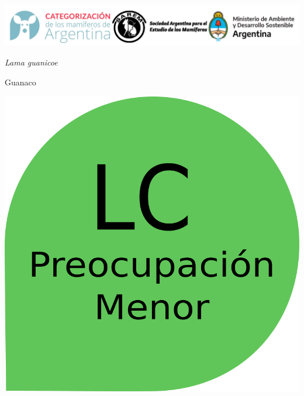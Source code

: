 \documentclass[
  x11names]{article}
\author{}
\date{\vspace{-2.5em}Fecha de creación: 03 April, 2023}
\begin{document}
\setmainfont{Arial}
\setsansfont{Arial}
\setmonofont{Arial}

\newcommand\invisiblesection[1]{%
  \refstepcounter{section}%
  \addcontentsline{toc}{section}{\protect\numberline{\thesection}#1}%
  \sectionmark{#1}}


%
\vspace{-0.4cm}

\includegraphics[width=1\linewidth]{images/Base_info/logo}

\vspace{1cm}

\begin{minipage}{0.7\textwidth}
\vspace{0.3cm}
\fontsize{20}{24}\selectfont\textit{Lama guanicoe}

\vspace{0.3cm}
\fontsize{30}{36}\selectfont Guanaco
\end{minipage}
\hspace{0.05\textwidth}
\begin{minipage}{0.25\textwidth}
\includegraphics[width=\textwidth]{images/lc.png}
\end{minipage}
\end{document}
